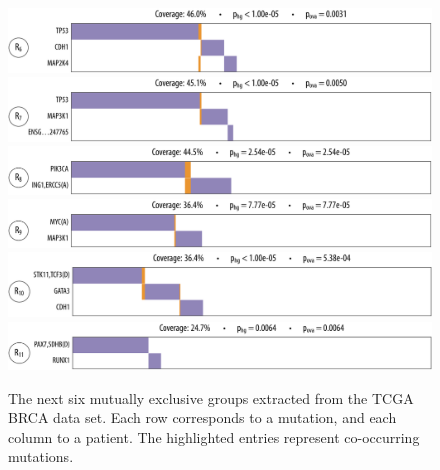 \begin{figure}[htbp]
\centering
\includegraphics[width=\textwidth]{figures/genes/brca_4.pdf}\\[2em]
\includegraphics[width=\textwidth]{figures/genes/brca_3.pdf}\\[2em]
\includegraphics[width=\textwidth]{figures/genes/brca_11.pdf}\\[2em]
\includegraphics[width=\textwidth]{figures/genes/brca_10.pdf}\\[2em]
\includegraphics[width=\textwidth]{figures/genes/brca_7.pdf}\\[2em]
\includegraphics[width=\textwidth]{figures/genes/brca_9.pdf}\\[2em]
\caption{The next six mutually exclusive groups extracted from the TCGA BRCA data set.
Each row corresponds to a mutation, and each column to a patient.
The highlighted entries represent co-occurring mutations.}
\label{fig:rep_brca_2}
\end{figure}

